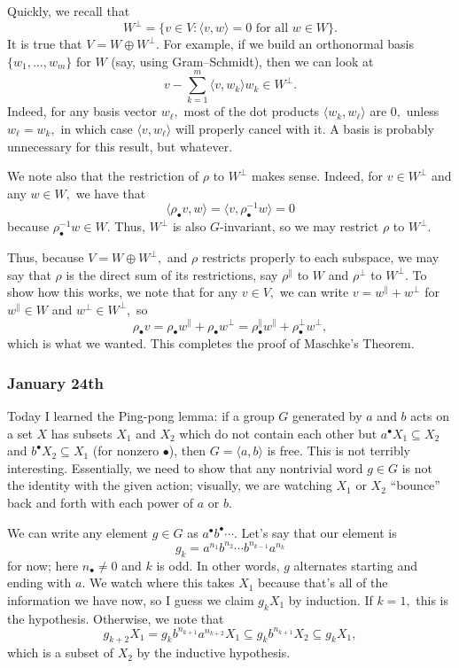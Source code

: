 Quickly, we recall that
\[W^\perp=\{v\in V:\langle v,w\rangle=0\text{ for all }w\in W\}.\]
It is true that $V=W\oplus W^\perp.$ For example, if we build an orthonormal basis $\{w_1,\ldots,w_m\}$ for $W$ (say, using Gram--Schmidt), then we can look at
\[v-\sum_{k=1}^m\langle v,w_k\rangle w_k\in W^\perp.\]
Indeed, for any basis vector $w_\ell,$ most of the dot products $\langle w_k,w_\ell\rangle$ are $0,$ unless $w_\ell=w_k,$ in which case $\langle v,w_\ell\rangle$ will properly cancel with it. A basis is probably unnecessary for this result, but whatever.

We note also that the restriction of $\rho$ to $W^\perp$ makes sense. Indeed, for $v\in W^\perp$ and any $w\in W,$ we have that
\[\langle\rho_\bullet v,w\rangle=\langle v,\rho_\bullet^{-1}w\rangle=0\]
because $\rho_\bullet^{-1}w\in W.$ Thus, $W^\perp$ is also $G$-invariant, so we may restrict $\rho$ to $W^\perp.$

Thus, because $V=W\oplus W^\perp,$ and $\rho$ restricts properly to each subspace, we may say that $\rho$ is the direct sum of its restrictions, say $\rho^\parallel$ to $W$ and $\rho^\perp$ to $W^\perp.$ To show how this works, we note that for any $v\in V,$ we can write $v=w^\parallel+w^\perp$ for $w^\parallel\in W$ and $w^\perp\in W^\perp,$ so
\[\rho_\bullet v=\rho_\bullet w^\parallel+\rho_\bullet w^\perp=\rho^\parallel_\bullet w^\parallel+\rho^\perp_\bullet w^\perp,\]
which is what we wanted. This completes the proof of Maschke’s Theorem.

\subsubsection{January 24th}
Today I learned the Ping-pong lemma: if a group $G$ generated by $a$ and $b$ acts on a set $X$ has subsets $X_1$ and $X_2$ which do not contain each other but $a^\bullet X_1\subseteq X_2$ and $b^\bullet X_2\subseteq X_1$ (for nonzero $\bullet$), then $G=\langle a,b\rangle$ is free. This is not terribly interesting. Essentially, we need to show that any nontrivial word $g\in G$ is not the identity with the given action; visually, we are watching $X_1$ or $X_2$ ``bounce'' back and forth with each power of $a$ or $b.$

We can write any element $g\in G$ as $a^\bullet b^\bullet\cdots.$ Let's say that our element is
\[g_k=a^{n_1}b^{n_2}\cdots b^{n_{k-1}}a^{n_k}\]
for now; here $n_\bullet\ne0$ and $k$ is odd. In other words, $g$ alternates starting and ending with $a.$ We watch where this takes $X_1$ because that's all of the information we have now, so I guess we claim $g_kX_1$ by induction. If $k=1,$ this is the hypothesis. Otherwise, we note that
\[g_{k+2}X_1=g_kb^{n_{k+1}}a^{n_{k+2}}X_1\subseteq g_kb^{n_{k+1}}X_2\subseteq g_kX_1,\]
which is a subset of $X_2$ by the inductive hypothesis.

